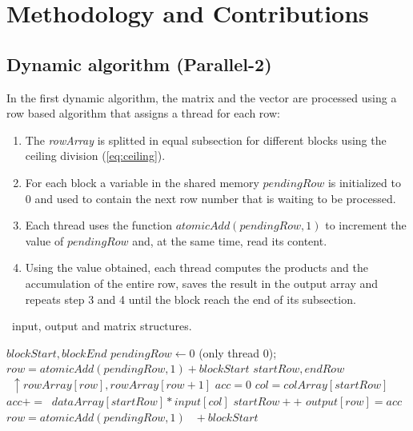 \documentclass[conference]{IEEEtran}
\begin{document}
\section{Methodology and Contributions}\label{sec:methodology}

\subsection{Dynamic algorithm (Parallel-2)}
In the first dynamic algorithm, the matrix and the vector are processed using a row based algorithm that assigns a thread for each row:
\begin{enumerate}
    \item The {\it{rowArray}} is splitted in equal subsection for different blocks using the ceiling division (\ref{eq:ceiling}). 
    \item For each block a variable in the shared memory $pendingRow$ is initialized to 0 and used to contain the next row number that is waiting to be processed. 
    \item Each thread uses the function $atomicAdd(pendingRow,1)$ to increment the value of $pendingRow$ and, at the same time, read its content.
    \item Using the value obtained, each thread computes the products and the accumulation of the entire row, saves the result in the output array and repeats step 3 and 4 until the block reach the end of its subsection. 
\end{enumerate}

\begin{algorithm}[h!]
\small
\caption{Dynamic SpVM algorithm}
\algorithmicrequire~input, output and matrix structures.
\begin{algorithmic}[1]
\State $blockStart,blockEnd$ 
\State $pendingRow\leftarrow0$ \Comment(only thread 0);
\State $row=atomicAdd(pendingRow,1)+blockStart$
\State $startRow,endRow$
\State $\ \ \uparrow rowArray[row],rowArray[row+1]$
\State $acc=0$
\State $col=colArray[startRow]$
\State $acc+=$
\State $\ dataArray[startRow]*input[col]$
\State $startRow++$
\EndWhile
\State $output[row]=acc$
\State $row=atomicAdd(pendingRow,1)$
\State $\ \ +blockStart$
\EndWhile
\EndProcedure
\end{algorithmic}
\label{alg:dynamic1}
\end{algorithm}
\end{document}
